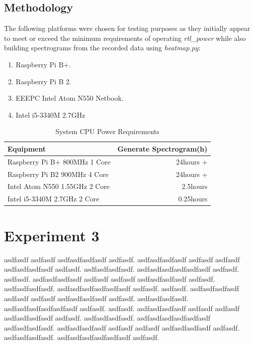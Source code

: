 \documentclass[runningheads,a4paper]{llncs}
\begin{document}
\subsection*{Methodology}
The following platforms were chosen for testing purposes as they initially appear to meet or exceed the minimum requirements of operating \textit{rtl\_power} while also building spectrograms from the recorded data using \textit{heatmap.py}:

\begin{enumerate}
	\item Raspberry Pi B+.
	\item Raspberry Pi B 2. 
	\item EEEPC Intel Atom N550 Netbook.
	\item Intel i5-3340M 2.7GHz
\end{enumerate}


%
\begin{table}
	\centering
	\begin{tabular}{l r}
		\toprule
		Equipment & Generate Spectrogram(h) \\ \midrule
		Raspberry Pi B+ 800MHz 1 Core & 24hours + \\
		Raspberry Pi B2 900MHz 4 Core & 24hours + \\
		Intel Atom N550 1.55GHz 2 Core & 2.5hours \\
		Intel i5-3340M 2.7GHz 2 Core & 0.25hours \\
		\bottomrule
	\end{tabular}
	\caption{System CPU Power Requirements}
	\label{tab:system_cpu_power_requirements}
\end{table}
%


\section*{Experiment 3}
asdfasdf asdfasdf asdfasdfasdfasdf asdfasdf. asdfasdfasdfasdf asdfasdf asdfasdf asdfasdfasdfasdf asdfasdf. asdfasdfasdfasdf. asdfasdfasdfasdfasdfasdf asdfasdf. asdfasdf. asdfasdfasdfasdf asdfasdf asdfasdf asdfasdfasdfasdf asdfasdf. asdfasdfasdfasdf. asdfasdfasdfasdfasdfasdf asdfasdf. asdfasdf. asdfasdfasdfasdf asdfasdf asdfasdf asdfasdfasdfasdf asdfasdf. asdfasdfasdfasdf. asdfasdfasdfasdfasdfasdf asdfasdf. asdfasdf. asdfasdfasdfasdf asdfasdf asdfasdf asdfasdfasdfasdf asdfasdf. asdfasdfasdfasdf. asdfasdfasdfasdfasdfasdf asdfasdfasdfasdf. asdfasdfasdfasdf asdfasdf asdfasdf asdfasdfasdfasdf asdfasdf. asdfasdfasdfasdf. asdfasdfasdfasdfasdfasdf asdfasdf.
\end{document}
